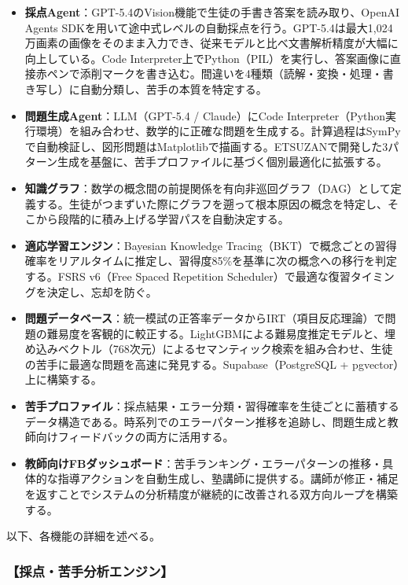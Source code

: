 \documentclass[paper=a4,fontsize=10.5bp,jafontsize=10.5bp,twocolumn]{jlreq}
\begin{document}
\begin{itemize}
  \item \textbf{採点Agent}：GPT-5.4のVision機能で生徒の手書き答案を読み取り、OpenAI Agents SDKを用いて途中式レベルの自動採点を行う。GPT-5.4は最大1,024万画素の画像をそのまま入力でき、従来モデルと比べ文書解析精度が大幅に向上している。Code Interpreter上でPython（PIL）を実行し、答案画像に直接赤ペンで添削マークを書き込む。間違いを4種類（読解・変換・処理・書き写し）に自動分類し、苦手の本質を特定する。

  \item \textbf{問題生成Agent}：LLM（GPT-5.4 / Claude）にCode Interpreter（Python実行環境）を組み合わせ、数学的に正確な問題を生成する。計算過程はSymPyで自動検証し、図形問題はMatplotlibで描画する。ETSUZANで開発した3パターン生成を基盤に、苦手プロファイルに基づく個別最適化に拡張する。

  \item \textbf{知識グラフ}：数学の概念間の前提関係を有向非巡回グラフ（DAG）として定義する。生徒がつまずいた際にグラフを遡って根本原因の概念を特定し、そこから段階的に積み上げる学習パスを自動決定する。

  \item \textbf{適応学習エンジン}：Bayesian Knowledge Tracing（BKT）で概念ごとの習得確率をリアルタイムに推定し、習得度85\%を基準に次の概念への移行を判定する。FSRS v6（Free Spaced Repetition Scheduler）で最適な復習タイミングを決定し、忘却を防ぐ。

  \item \textbf{問題データベース}：統一模試の正答率データからIRT（項目反応理論）で問題の難易度を客観的に較正する。LightGBMによる難易度推定モデルと、埋め込みベクトル（768次元）によるセマンティック検索を組み合わせ、生徒の苦手に最適な問題を高速に発見する。Supabase（PostgreSQL + pgvector）上に構築する。

  \item \textbf{苦手プロファイル}：採点結果・エラー分類・習得確率を生徒ごとに蓄積するデータ構造である。時系列でのエラーパターン推移を追跡し、問題生成と教師向けフィードバックの両方に活用する。

  \item \textbf{教師向けFBダッシュボード}：苦手ランキング・エラーパターンの推移・具体的な指導アクションを自動生成し、塾講師に提供する。講師が修正・補足を返すことでシステムの分析精度が継続的に改善される双方向ループを構築する。
\end{itemize}

以下、各機能の詳細を述べる。

\subsubsection{【採点・苦手分析エンジン】}
\end{document}

